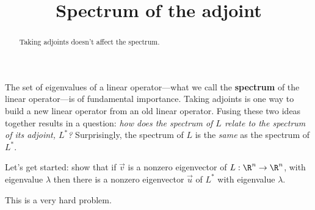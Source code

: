 \documentclass{ximera}
\title{Spectrum of the adjoint}
\begin{document}
\begin{abstract}
  Taking adjoints doesn't affect the spectrum.
\end{abstract}

The set of eigenvalues of a linear operator---what we call the
\textbf{spectrum} of the linear operator---is of fundamental
importance.  Taking adjoints is one way to build a new linear operator
from an old linear operator.  Fusing these two ideas together results
in a question: \textit{how does the spectrum of $L$ relate to the
  spectrum of its adjoint, $L^*$?}  Surprisingly, the spectrum of $L$
is the \textit{same} as the spectrum of $L^*$.
	
Let's get started: show that if $\vec{v}$ is a nonzero eigenvector of
$L:\R^n \to \R^n$, with eigenvalue $\lambda$ then there is a nonzero
eigenvector $\vec{u}$ of $L^*$ with eigenvalue $\lambda$.

\begin{warning}
  This is a very hard problem.
\end{warning}
\end{document}
